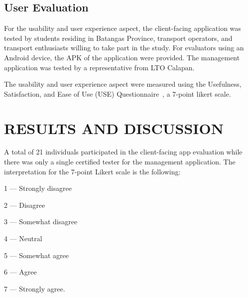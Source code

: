 \documentclass{icsthesis}
\begin{document}
\begin{mainmatter}
\begin{description}
		\end{description}
		
		\subsection{User Evaluation}
		For the usability and user experience aspect, the client-facing application was tested by students residing in Batangas Province, transport operators, and transport enthusiasts willing to take part in the study. For evaluators using an Android device, the APK of the application were provided.
		The management application was tested by a representative from LTO Calapan.
		
		The usability and user experience aspect were measured using the Usefulness, Satisfaction, and Ease of Use (USE) Questionnaire~\cite{Lund01}, a 7-point likert scale. 
		
		
		\section{RESULTS AND DISCUSSION}
		A total of 21 individuals participated in the client-facing app evaluation while there was only a single certified tester for the management application. The interpretation for the 7-point Likert scale is the following:

		\begin{description}
			\item 1 --- Strongly disagree
			\item 2 --- Disagree
			\item 3 --- Somewhat disagree
			\item 4 --- Neutral
			\item 5 --- Somewhat agree
			\item 6 --- Agree
			\item 7 --- Strongly agree.
		\end{description}
		

\end{mainmatter}
\end{document}
